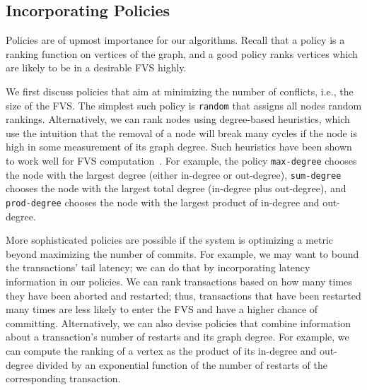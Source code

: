 \subsection{Incorporating Policies}
\label{subsec:validator_reordering:policy}

Policies are of upmost importance for our algorithms. Recall that a policy is a ranking function on vertices of the graph, and a good policy ranks vertices which are likely to be in a desirable FVS highly. 

We first discuss policies that aim at minimizing the number of conflicts, i.e., the size of the FVS. The simplest such policy is \texttt{random} that assigns all nodes random rankings. Alternatively, we can rank nodes using degree-based heuristics, which use the intuition that the removal of a node will break many cycles if the node is high in some measurement of its graph degree. Such heuristics have  been shown to work well for FVS computation~\cite{cutello2015targeting}. For example, the policy \texttt{max-degree} chooses the node with the largest degree (either in-degree or out-degree), \texttt{sum-degree} chooses the node with the largest total degree (in-degree plus out-degree), and \texttt{prod-degree} chooses the node with the largest product of in-degree and out-degree. 

More sophisticated policies are possible if the system is optimizing a metric beyond maximizing the number of commits. For example, we may want to bound the transactions' tail latency; we can do that by incorporating latency information in our policies. We can rank transactions based on how many times they have been aborted and restarted; thus, transactions that have been restarted many times are less likely to enter the FVS and have a higher chance of committing.  Alternatively, we can also devise policies that combine information about a transaction's number of restarts and its graph degree. For example, we can compute the ranking of a vertex as the product of its in-degree and out-degree divided by an exponential function of the number of restarts of the corresponding transaction. 


